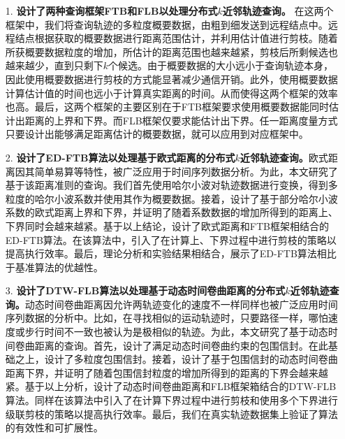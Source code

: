 \begin{itemize}
	\item[1.] \textbf{设计了两种查询框架FTB和FLB以处理分布式$k$近邻轨迹查询。}
	在这两个框架中，我们将查询轨迹的多粒度概要数据，由粗到细发送到远程结点中。远程结点根据获取的概要数据进行距离范围估计，并利用估计值进行剪枝。随着所获概要数据粒度的增加，所估计的距离范围也越来越紧，剪枝后所剩候选也越来越少，直到只剩下$k$个候选。由于概要数据的大小远小于查询轨迹本身，因此使用概要数据进行剪枝的方式能显著减少通信开销。此外，使用概要数据计算估计值的时间也远小于计算真实距离的时间。从而使得这两个框架的效率也高。最后，这两个框架的主要区别在于FTB框架要求使用概要数据能同时估计出距离的上界和下界。而FLB框架仅要求能估计出下界。任一距离度量方式只要设计出能够满足距离估计的概要数据，就可以应用到对应框架中。
	
	\item[2.] \textbf{设计了ED-FTB算法以处理基于欧式距离的分布式$k$近邻轨迹查询。}欧式距离因其简单易算等特性，被广泛应用于时间序列数据分析。为此，本文研究了基于该距离准则的查询。我们首先使用哈尔小波对轨迹数据进行变换，得到多粒度的哈尔小波系数并使用其作为概要数据。接着，设计了基于部分哈尔小波系数的欧式距离上界和下界，并证明了随着系数数据的增加所得到的距离上、下界同时会越来越紧。基于以上结论，设计了欧式距离和FTB框架相结合的ED-FTB算法。在该算法中，引入了在计算上、下界过程中进行剪枝的策略以提高执行效率。最后，理论分析和实验结果相结合，展示了ED-FTB算法相比于基准算法的优越性。
	
	\item[3.] \textbf{设计了DTW-FLB算法以处理基于动态时间卷曲距离的分布式$k$近邻轨迹查询。}动态时间卷曲距离因允许两轨迹变化的速度不一样同样也被广泛应用时间序列数据的分析中。比如，在寻找相似的运动轨迹时，只要路径一样，哪怕速度或步行时间不一致也被认为是极相似的轨迹。为此，本文研究了基于动态时间卷曲距离的查询。首先，设计了满足动态时间卷曲约束的包围信封。在此基础之上，设计了多粒度包围信封。接着，设计了基于包围信封的动态时间卷曲距离下界，并证明了随着包围信封粒度的增加所得到的距离的下界会越来越紧。基于以上分析，设计了动态时间卷曲距离和FLB框架箱结合的DTW-FLB算法。同样在该算法中引入了在计算下界过程中进行剪枝和使用多个下界进行级联剪枝的策略以提高执行效率。最后，我们在真实轨迹数据集上验证了算法的有效性和可扩展性。
\end{itemize}
\hspace{-0.5cm}
 
